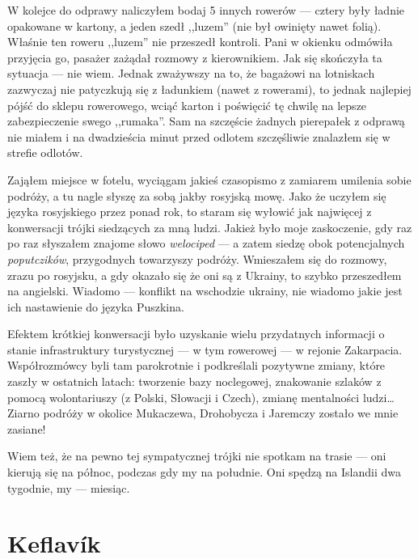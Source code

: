 
W kolejce do odprawy naliczyłem bodaj 5 innych rowerów --- cztery były ładnie opakowane w kartony, a jeden szedł ,,luzem'' (nie był owinięty nawet folią). Właśnie ten roweru ,,luzem'' nie przeszedł kontroli. Pani w okienku odmówiła przyjęcia go, pasażer zażądał rozmowy z kierownikiem. Jak się skończyła ta sytuacja --- nie wiem. Jednak zważywszy na to, że bagażowi na lotniskach zazwyczaj nie patyczkują się z ładunkiem (nawet z rowerami), to jednak najlepiej pójść do sklepu rowerowego, wciąć karton i poświęcić tę chwilę na lepsze zabezpieczenie swego ,,rumaka''. Sam na szczęście żadnych pierepałek z odprawą nie miałem i na dwadzieścia minut przed odlotem szczęśliwie znalazłem się w strefie odlotów.

Zająłem miejsce w fotelu, wyciągam jakieś czasopismo z zamiarem umilenia sobie podróży, a tu nagle słyszę za sobą jakby rosyjską mowę. Jako że uczyłem się języka rosyjskiego przez ponad rok, to staram się wyłowić jak najwięcej z konwersacji trójki siedzących za mną ludzi. Jakież było moje zaskoczenie, gdy raz po raz słyszałem znajome słowo \emph{welociped} --- a zatem siedzę obok potencjalnych \emph{poputczików}, przygodnych towarzyszy podróży. Wmieszałem się do rozmowy, zrazu po rosyjsku, a gdy okazało się że oni są z Ukrainy, to szybko przeszedłem na angielski. Wiadomo --- konflikt na wschodzie ukrainy, nie wiadomo jakie jest ich nastawienie do języka Puszkina.

Efektem krótkiej konwersacji było uzyskanie wielu przydatnych informacji o stanie infrastruktury turystycznej --- w tym rowerowej --- w rejonie Zakarpacia. Współrozmówcy byli tam parokrotnie i podkreślali pozytywne zmiany, które zaszły w ostatnich latach: tworzenie bazy noclegowej, znakowanie szlaków z pomocą wolontariuszy (z Polski, Słowacji i Czech), zmianę mentalności ludzi…  Ziarno podróży w okolice Mukaczewa, Drohobycza i Jaremczy zostało we mnie zasiane!

Wiem też, że na pewno tej sympatycznej trójki nie spotkam na trasie --- oni kierują się na północ, podczas gdy my na południe. Oni spędzą na Islandii dwa tygodnie, my --- miesiąc.

\section*{Keflavík}

